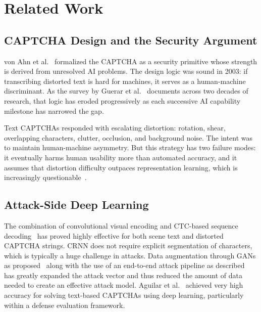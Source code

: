 \documentclass[pdflatex,sn-mathphys-num,iicol]{sn-jnl}
\begin{document}
\section{Related Work}

\subsection{CAPTCHA Design and the Security Argument}

von Ahn et al.~\cite{vonahn2003captcha} formalized the CAPTCHA as a security primitive whose strength is derived from unresolved AI problems. The design logic was sound in 2003: if transcribing distorted text is hard for machines, it serves as a human-machine discriminant. As the survey by Guerar et al.~\cite{guerar2021captcha} documents across two decades of research, that logic has eroded progressively as each successive AI capability milestone has narrowed the gap.

Text CAPTCHAs responded with escalating distortion: rotation, shear, overlapping characters, clutter, occlusion, and background noise. The intent was to maintain human-machine asymmetry. But this strategy has two failure modes: it eventually harms human usability more than automated accuracy, and it assumes that distortion difficulty outpaces representation learning, which is increasingly questionable~\cite{guerar2021captcha,bursztein2014end}.

\subsection{Attack-Side Deep Learning}

The combination of convolutional visual encoding and CTC-based sequence decoding~\cite{lecun1998gradient,shi2017crnn,graves2006ctc,chen2017captcha} has proved highly effective for both scene text and distorted CAPTCHA strings. CRNN does not require explicit segmentation of characters, which is typically a huge challenge in attacks. Data augmentation through GANs as proposed~\cite{goodfellow2014generative,ye2018captcha} along with the use of an end-to-end attack pipeline as described~\cite{li2020endtoendcaptcha} has greatly expanded the attack vector and thus reduced the amount of data needed to create an effective attack model. Aguilar et al.~\cite{aguilar2021captcha} achieved very high accuracy for solving text-based CAPTCHAs using deep learning, particularly within a defense evaluation framework.
\end{document}
